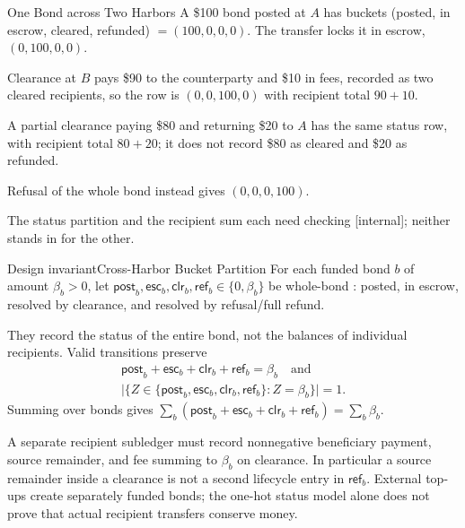 \documentclass[11pt,a4paper]{article}
\theoremstyle{definition}
\theoremstyle{remark}
\begin{document}
\begin{pdexample}{One Bond across Two Harbors}
\setlength{\parskip}{4pt plus 1pt}
\pdbondrecipientexample
A \$100 bond posted at $A$ has buckets (posted, in escrow, cleared, refunded) $=(100,0,0,0)$. The transfer
locks it in escrow, $(0,100,0,0)$.

Clearance at $B$ pays \$90 to the
counterparty and \$10 in fees, recorded as two cleared recipients, so the row
is $(0,0,100,0)$ with recipient total $90+10$.

A partial clearance paying \$80
and returning \$20 to $A$ has the same status row, with recipient total $80+20$;
it does not record \$80 as cleared and \$20 as refunded.

Refusal of the whole bond instead gives
$(0,0,0,100)$.

The status partition and the recipient sum each need checking
[internal]; neither stands in for the other.
\end{pdexample}

\begin{pdclaim}{Design invariant}{Cross-Harbor Bucket Partition}
\setlength{\parskip}{4pt plus 1pt}
\label{prop:fh-cross-cons}
For each funded bond $b$ of amount $\beta_b>0$, let $\mathsf{post}_b,\mathsf{esc}_b,\mathsf{clr}_b,\mathsf{ref}_b\in\{0,\beta_b\}$
be whole-bond : posted, in escrow, resolved by clearance,
and resolved by refusal/full refund.

They record the status of the entire bond,
not the balances of individual recipients. Valid transitions preserve
\[
\begin{gathered}
\mathsf{post}_b+\mathsf{esc}_b+\mathsf{clr}_b+\mathsf{ref}_b=\beta_b
\quad\text{and}\\
\bigl|\{Z\in\{\mathsf{post}_b,\mathsf{esc}_b,\mathsf{clr}_b,\mathsf{ref}_b\}:Z=\beta_b\}\bigr|=1.
\end{gathered}
\]
Summing over bonds gives $\sum_b(\mathsf{post}_b+\mathsf{esc}_b+\mathsf{clr}_b+\mathsf{ref}_b)=\sum_b \beta_b$.


A separate recipient subledger must record nonnegative beneficiary payment,
source remainder, and fee summing to $\beta_b$ on clearance. In particular a source
remainder inside a clearance is not a second lifecycle entry in $\mathsf{ref}_b$.
External top-ups create separately funded bonds; the one-hot status model alone
does not prove that actual recipient transfers conserve money.
\end{pdclaim}
\end{document}
